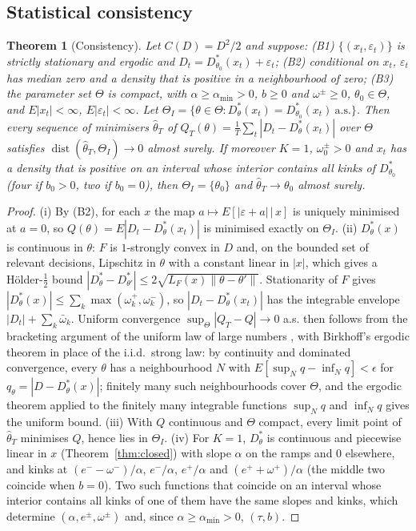 \documentclass[pdflatex,sn-basic]{sn-jnl}
\theoremstyle{thmstyleone}\newtheorem{proposition}{Proposition}\newtheorem{theorem}{Theorem}
\theoremstyle{thmstylethree}\newtheorem{remark}{Remark}
\begin{document}
\subsection{Statistical consistency}\label{sec:consistency}
\begin{theorem}[Consistency]\label{thm:cons}
Let $C(D)=D^2/2$ and suppose: (B1) $\{(x_t,\varepsilon_t)\}$ is strictly stationary and ergodic and $D_t=D^*_{\theta_0}(x_t)+\varepsilon_t$; (B2) conditional on $x_t$, $\varepsilon_t$ has median zero and a density that is positive in a neighbourhood of zero; (B3) the parameter set $\Theta$ is compact, with $\alpha\ge\alpha_{\min}>0$, $b\ge0$ and $\omega^\pm\ge0$, $\theta_0\in\Theta$, and $E|x_t|<\infty$, $E|\varepsilon_t|<\infty$. Let $\Theta_I=\{\theta\in\Theta: D^*_\theta(x_t)=D^*_{\theta_0}(x_t)\ \text{a.s.}\}$. Then every sequence of minimisers $\hat\theta_T$ of $Q_T(\theta)=\frac1T\sum_t|D_t-D^*_\theta(x_t)|$ over $\Theta$ satisfies $\operatorname{dist}(\hat\theta_T,\Theta_I)\to0$ almost surely. If moreover $K=1$, $\omega_0^\pm>0$ and $x_t$ has a density that is positive on an interval whose interior contains all kinks of $D^*_{\theta_0}$ (four if $b_0>0$, two if $b_0=0$), then $\Theta_I=\{\theta_0\}$ and $\hat\theta_T\to\theta_0$ almost surely.
\end{theorem}
\begin{proof}
(i) By (B2), for each $x$ the map $a\mapsto E[|\varepsilon+a|\,|\,x]$ is uniquely minimised at $a=0$, so $Q(\theta)=E|D_t-D^*_\theta(x_t)|$ is minimised exactly on $\Theta_I$. (ii) $D^*_\theta(x)$ is continuous in $\theta$: $F$ is $1$-strongly convex in $D$ and, on the bounded set of relevant decisions, Lipschitz in $\theta$ with a constant linear in $|x|$, which gives a H\"older-$\tfrac12$ bound $|D^*_\theta-D^*_{\theta'}|\le2\sqrt{L_F(x)\|\theta-\theta'\|}$. Stationarity of $F$ gives $|D^*_\theta(x)|\le\sum_k\max(\omega_k^+,\omega_k^-)$, so $|D_t-D^*_\theta(x_t)|$ has the integrable envelope $|D_t|+\sum_k\bar\omega_k$. Uniform convergence $\sup_\Theta|Q_T-Q|\to0$ a.s. then follows from the bracketing argument of the uniform law of large numbers \citep[Lemma 2.4]{newey1994}, with Birkhoff's ergodic theorem in place of the i.i.d.\ strong law: by continuity and dominated convergence, every $\theta$ has a neighbourhood $N$ with $E[\sup_N q-\inf_N q]<\epsilon$ for $q_\theta=|D-D^*_\theta(x)|$; finitely many such neighbourhoods cover $\Theta$, and the ergodic theorem applied to the finitely many integrable functions $\sup_N q$ and $\inf_N q$ gives the uniform bound. (iii) With $Q$ continuous and $\Theta$ compact, every limit point of $\hat\theta_T$ minimises $Q$, hence lies in $\Theta_I$. (iv) For $K=1$, $D^*_\theta$ is continuous and piecewise linear in $x$ (Theorem~\ref{thm:closed}) with slope $\alpha$ on the ramps and $0$ elsewhere, and kinks at $(e^--\omega^-)/\alpha$, $e^-/\alpha$, $e^+/\alpha$ and $(e^++\omega^+)/\alpha$ (the middle two coincide when $b=0$). Two such functions that coincide on an interval whose interior contains all kinks of one of them have the same slopes and kinks, which determine $(\alpha,e^\pm,\omega^\pm)$ and, since $\alpha\ge\alpha_{\min}>0$, $(\tau,b)$.
\end{proof}
\end{document}

